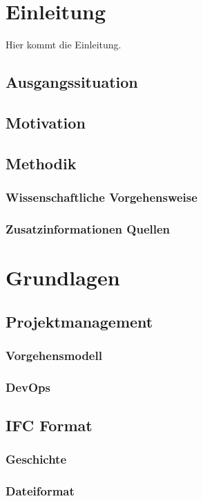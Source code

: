 \section{Einleitung}
\label{s:intro}

Hier kommt die Einleitung.

\subsection{Ausgangssituation}
\subsection{Motivation}
\subsection{Methodik}
\subsubsection{Wissenschaftliche Vorgehensweise}
\subsubsection{Zusatzinformationen Quellen}
\label{ss:intro:abc}

\section{Grundlagen}
\subsection{Projektmanagement}
\subsubsection{Vorgehensmodell}
\subsubsection{DevOps}

\subsection{IFC Format}
\subsubsection{Geschichte}
\subsubsection{Dateiformat}
